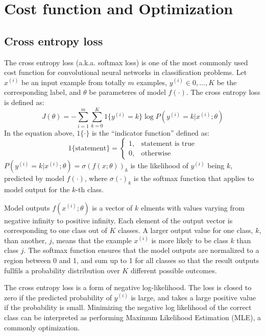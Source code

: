 



\section{Cost function and Optimization}

\subsection{Cross entropy loss}
\label{subsec:crossentropy}

The cross entropy loss (a.k.a. softmax loss) is one of the most commonly used cost function for convolutional neural networks in classification problems.
Let $x^{(i)}$ be an input example from totally $m$ examples, $y^{(i)} \in {0,...,K}$ be the corresponding label, and $\theta$ be parameteres of model $f(\cdot)$.
The cross entropy loss is defined as:
$$J(\theta) = - \sum_{i=1}^{m}\sum_{k=0}^{K} 1\{y^{(i)}=k\} \log P(y^{(i)}=k \vert x^{(i)}; \theta)$$
In the equation above, $1\{\cdot\}$ is the ``indicator function'' defined as:
\[
  1\{\text{statement}\} =
    \begin{cases}
      1, & \text{statement is true} \\
      0, & \text{otherwise}
    \end{cases}
\]
$P(y^{(i)} = k | x^{(i)} ; \theta) = \sigma(f(x;\theta))_k$ is the likelihood of $y^{(i)}$ being $k$, predicted by model $f(\cdot)$, where $\sigma(\cdot)_{k}$ is the softmax function that applies to model output for the $k$-th class.

Model outputs $f(x^{(i)};\theta)$ is a vector of $k$ elments with values varying from negative infinity to positive infinity.
Each element of the output vector is corresponding to one class out of $K$ classes.
A larger output value for one class, $k$, than another, $j$, means that the example $x^{(i)}$ is more likely to be class $k$ than class $j$.
The softmax function ensures that the model outputs are normalized to a region between 0 and 1, and sum up to 1 for all classes so that the result outputs fullfils a probability distribution over $K$ different possible outcomes.

The cross entropy loss is a form of negative log-likelihood.
The loss is closed to zero if the predicted probability of $y^{(i)}$ is large, and takes a large positive value if the probability is small.
Minimizing the negative log likelihood of the correct class can be interpreted as performing Maximum Likelihood Estimation (MLE), a commonly optimization.


